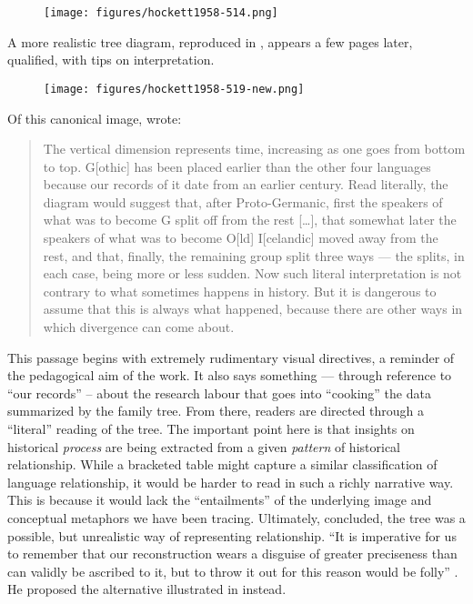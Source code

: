 \documentclass[output=paper]{langscibook}
\begin{document}
\begin{figure}
    \centering
    \texttt{[image: figures/hockett1958-514.png]}
    \caption{\citet[514]{Hockett19591958}}
    \label{fig:kaplan:hockett1959514}
\end{figure}

A more realistic tree diagram, reproduced in , appears a few pages later, qualified, with tips on interpretation.

\begin{figure}
    \centering
    \texttt{[image: figures/hockett1958-519-new.png]}
    \caption{\citet[519]{Hockett19591958}}
    \label{fig:kaplan:hockett1959519}
\end{figure}

Of this canonical image, {\Hockett} wrote:

\begin{quotation}
The vertical dimension represents time, increasing as one goes from bottom to top. G[othic] has been placed earlier than the other four languages because our records of it date from an earlier century. Read literally, the diagram would suggest that, after Proto-Germanic, first the speakers of what was to become G split off from the rest […], that somewhat later the speakers of what was to become O[ld] I[celandic] moved away from the rest, and that, finally, the remaining group split three ways — the splits, in each case, being more or less sudden. Now such literal interpretation is not contrary to what sometimes happens in history. But it is dangerous to assume that this is always what happened, because there are other ways in which divergence can come about.  \citep[519--521]{Hockett19591958}
\end{quotation}

This passage begins with extremely rudimentary visual directives, a reminder of the pedagogical aim of the work. It also says something — through reference to ``our records'' -- about the research labour that goes into ``cooking'' the data summarized by the family tree. From there, readers are directed through a ``literal'' reading of the tree. The important point here is that insights on historical \emph{process} are being extracted from a given \emph{pattern} of historical relationship. While a bracketed table might capture a similar classification of language relationship, it would be harder to read in such a richly narrative way. This is because it would lack the ``entailments'' of the underlying image and conceptual metaphors we have been tracing. Ultimately, {\Hockett} concluded, the tree was a possible, but unrealistic way of representing relationship. ``It is imperative for us to remember that our reconstruction wears a disguise of greater preciseness than can validly be ascribed to it, but to throw it out for this reason would be folly'' \citep[523]{Hockett19591958}. He proposed the alternative illustrated in  instead.
\end{document}

